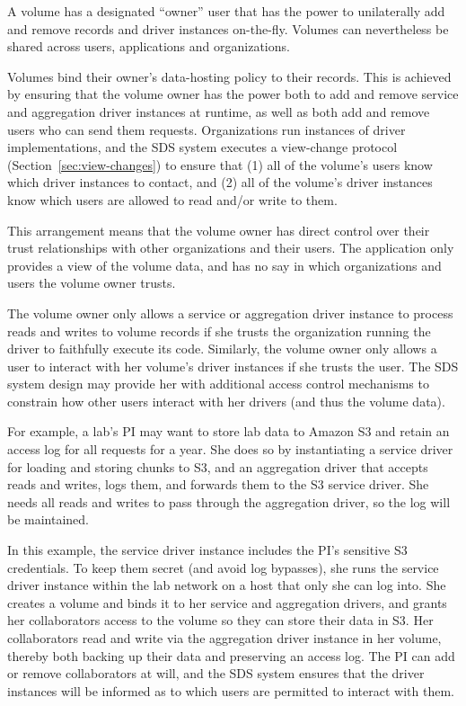 A volume has a designated ``owner'' user that has the power to unilaterally
add and remove records and driver instances on-the-fly.  Volumes can
nevertheless be shared across users, applications and organizations.

Volumes bind their owner's data-hosting policy to their records.  This is
achieved by ensuring that the volume owner has the power both to add and remove
service and aggregation driver instances at runtime, as well as both add and remove users
who can send them requests.  Organizations run instances of driver implementations, and the SDS
system executes a view-change protocol (Section~\ref{sec:view-changes}) to
ensure that (1) all of the volume's users know which driver instances to
contact, and (2) all of the volume's driver instances know which users are
allowed to read and/or write to them.

This arrangement means that the volume owner has direct control
over their trust relationships with other organizations and their users.
The application only provides a view of the volume data, and has no
say in which organizations and users the volume owner trusts.

The volume owner only allows a service or aggregation driver instance
to process reads and writes to
volume records if she trusts the organization running the driver to faithfully
execute its code.   Similarly, the volume owner only allows a user to
interact with her volume's driver instances if she trusts the user.  The SDS
system design may provide her with additional access control mechanisms to
constrain how other users interact with her drivers (and thus the volume data).

For example, a lab's PI may want to store lab data to Amazon S3 and retain an
access log for all requests for a year.  She does so by instantiating a service
driver for loading and storing chunks to S3, and an aggregation driver that
accepts reads and writes, logs them, and forwards them to the S3 service driver.
She needs all reads and writes to pass through the aggregation driver, so the
log will be maintained.

In this example, the service driver instance includes the PI's sensitive S3
credentials.  To keep them secret (and avoid log bypasses), 
she runs the service driver instance within the lab network on a host that only she can log
into.  She creates a volume and binds it to her service and aggregation drivers,
and grants her collaborators access to the volume so they can store their data
in S3.  Her collaborators read and write via the
aggregation driver instance in her volume, thereby both backing up their data 
and preserving an access log.  The PI can add or remove collaborators at
will, and the SDS system ensures that the driver instances will be informed
as to which users are permitted to interact with them.

